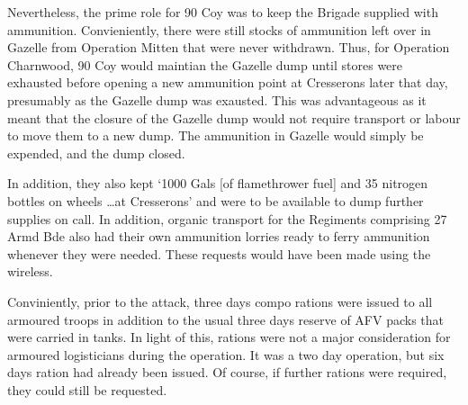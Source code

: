 \documentclass[noraggedright]{turabian-researchpaper}
\newcommand{\CharnAdm}{27 Armd Bde Adm Order No. 7, 7 July 1944}
\begin{document}
Nevertheless, the prime role for 90 Coy was to keep the Brigade supplied
with ammunition.  Convieniently, there were still stocks of ammunition left
over in Gazelle from Operation Mitten that were never withdrawn.  Thus, for
Operation Charnwood, 90 Coy would maintian the Gazelle dump until stores 
were exhausted before opening a new ammunition point at Cresserons later 
that day, presumably as the Gazelle dump was exausted.\autocites[\CharnAdm]
{27wd}[8 July 1944]{90wd}
This was advantageous as it meant that the closure of the Gazelle dump would 
not require transport or labour to move them to a new dump.  The ammunition 
in Gazelle would simply be expended, and the dump closed.  

In addition, they also kept `1000 Gals [of flamethrower fuel]
and 35 nitrogen bottles on wheels \ldots at Cresserons' and were to be
available to dump further supplies on call.\autocite[\CharnAdm][Para 6]
{27wd} In addition, organic transport for the Regiments comprising 27 Armd
Bde also had their own ammunition lorries ready to ferry ammunition whenever
they were needed.  These requests would have been made using the 
wireless.\autocite[13th/18th Royal Hussars Operation Order No. 1, Operation
Charnwood (See July appendix)][Para 9b]{1318wd}

Conviniently, prior to the attack, three days compo rations were issued to
all armoured troops in addition to the usual three days reserve of AFV
packs that were carried in tanks.\autocite[\CharnAdm][Para 7]{27wd}  
In light of this, rations were not a 
major consideration for armoured logisticians during the operation.  It was
a two day operation, but six days ration had already been issued.  Of course,
if further rations were required, they could still be requested.
\end{document}
